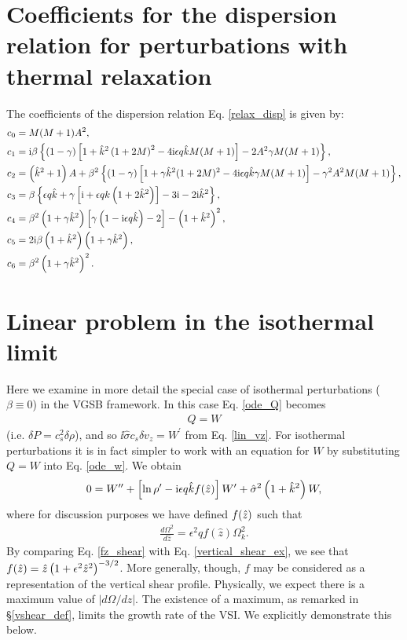 \section{Coefficients for the dispersion relation for perturbations
with thermal relaxation}\label{relax_coeff}
The coefficients of the dispersion relation Eq. \ref{relax_disp} is
given by:
\begin{align}
  &c_0 = M(M+1)A^2,\\
  &c_1 = \mathrm{i}\beta\left\{\left(1-\gamma\right)\left[1 +
      \hat{k}^2\left(1+2M\right)^2 - 4 \mathrm{i}\epsilon q\hat{k} M (M+1)\right] 
    - 2A^2\gamma M (M+1)\right\},\\
  &c_2 = \left(\hat{k}^2 + 1\right)A + \beta^2\left\{(1-\gamma)\left[1
      + \gamma \hat{k}^2(1+2M)^2 - 4\mathrm{i}\epsilon q \hat{k} \gamma M(M+1)
    \right]
    -\gamma^2 A^2 M(M+1)
  \right\},\\
  &c_3 = \beta\left\{\epsilon q \hat{k} + \gamma \left[\mathrm{i} + \epsilon q
      k \left(1+2\hat{k}^2\right)\right] - 3\mathrm{i} - 2\mathrm{i}
    \hat{k}^2\right\},\\
  &c_4 =
  \beta^2\left(1+\gamma\hat{k}^2\right)\left[\gamma\left(1-\mathrm{i}\epsilon q
    \hat{k}\right)-2\right] - \left(1+\hat{k}^2\right)^2,\\
&c_5 = 2\mathrm{i}\beta\left(1+\hat{k}^2\right)\left(1+\gamma\hat{k}^2\right),\\
&c_6 = \beta^2\left(1+\gamma\hat{k}^2\right)^2.
\end{align}

\section{Linear problem in the isothermal limit}\label{iso_discuss}  
Here we examine in more detail the special case of isothermal
perturbations ($\beta\equiv 0$) in the VGSB framework.   
In this case Eq. \ref{ode_Q} becomes   
\begin{align} 
  Q = W 
\end{align}
(i.e. $\delta P = c_s^2\delta \rho$), and so $  \ii\hat{\sigma}c_s\delta v_z = W^\prime $
from Eq. \ref{lin_vz}. For isothermal perturbations it is in fact
simpler to work with an equation for $W$ by substituting $Q=W$ into
Eq. \ref{ode_w}. We obtain 
\begin{align}
  0 = W^{\prime\prime} + \left[\ln\rho^\prime - \mathrm{i} \epsilon q \hat{k}
    f(\hat{z})\right]W^\prime + \hat{\sigma}^2\left(1+\hat{k}^2\right)W,\label{iso_ode1}
\end{align}
where for discussion purposes we have defined $f(\hat{z})$ such that
\begin{align}\label{fz_shear}
  \frac{d\Omega^2}{d\hat{z}} = \epsilon^2q f(\hat{z})\Omega_k^2.
\end{align}
By comparing Eq. \ref{fz_shear} with Eq. \ref{vertical_shear_ex}, we
see that $f(\hat{z})= 
\hat{z}\left(1+\epsilon^2\hat{z}^2\right)^{-3/2}$. More generally, though,
$f$ may be considered as a representation of the vertical
shear profile. Physically, we expect there is a maximum value of 
$|d\Omega/dz|$. The existence of a maximum, as remarked in
\S\ref{vshear_def}, limits the growth rate of the VSI. We explicitly
demonstrate this below.    

